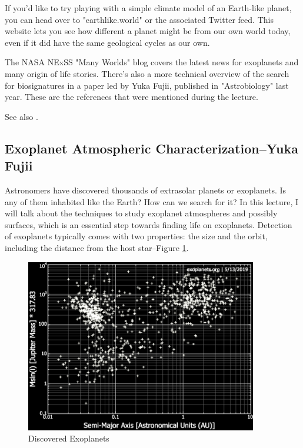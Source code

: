 \documentclass[]{article}
\begin{document}
If you'd like to try playing with a simple climate model of an Earth-like planet, you can head over to "earthlike.world" or the associated Twitter feed. This website lets you see how different a planet might be from our own world today, even if it did have the same geological cycles as our own.

The NASA NExSS "Many Worlds" blog covers the latest news for exoplanets
and many origin of life stories.
There's also a more technical overview of the search for biosignatures in a paper led by Yuka Fujii, published in "Astrobiology" last year.
These are the references that were mentioned during the lecture.

See also \cite{fujii2018exoplanet,villanueva2015unique}.

\subsection[Exoplanet Atmospheric Characterization]{Exoplanet Atmospheric Characterization--Yuka Fujii}

Astronomers have discovered
thousands of extrasolar planets
or exoplanets.
Is any of them inhabited like the Earth?
How can we search for it?
In this lecture, I will talk about
the techniques to study exoplanet
atmospheres and possibly surfaces,
which is an essential step towards
finding life on exoplanets.
Detection of exoplanets typically
comes with two properties:
the size and the orbit,
including the distance from the host star--Figure \ref{fig:discovered:exoplanets}.

\begin{figure}[H]
	\caption{Discovered Exoplanets}\label{fig:discovered:exoplanets}
	\includegraphics[width=0.9\textwidth]{ExoplanetCharacteristics}
\end{figure} 
\end{document}

